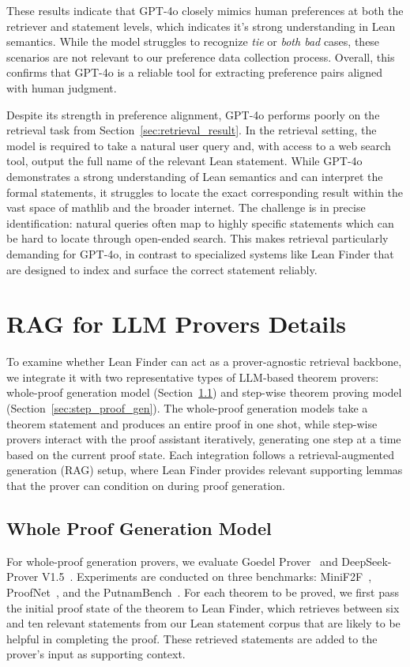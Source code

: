 \documentclass{article} %
\begin{document}
These results indicate that GPT-4o closely mimics human preferences at both the retriever and statement levels, which indicates it's strong understanding in Lean semantics. While the model struggles to recognize \emph{tie} or \emph{both bad} cases, these scenarios are not relevant to our preference data collection process. Overall, this confirms that GPT-4o is a reliable tool for extracting preference pairs aligned with human judgment.  

Despite its strength in preference alignment, GPT-4o performs poorly on the retrieval task from Section~\ref{sec:retrieval_result}. In the retrieval setting, the model is required to take a natural user query and, with access to a web search tool, output the full name of the relevant Lean statement. While GPT-4o demonstrates a strong understanding of Lean semantics and can interpret the formal statements, it struggles to locate the exact corresponding result within the vast space of mathlib and the broader internet. The challenge is in precise identification: natural queries often map to highly specific statements which can be hard to locate through open-ended search. This makes retrieval particularly demanding for GPT-4o, in contrast to specialized systems like Lean Finder that are designed to index and surface the correct statement reliably.

\section{RAG for LLM Provers Details}
\label{prover_integration_appendix}

To examine whether Lean Finder can act as a prover-agnostic retrieval backbone, we integrate it with two representative types of LLM-based theorem provers: whole-proof generation model (Section~\ref{sec:whole_proof_gen}) and step-wise theorem proving model (Section~\ref{sec:step_proof_gen}). The whole-proof generation models take a theorem statement and produces an entire proof in one shot, while step-wise provers interact with the proof assistant iteratively, generating one step at a time based on the current proof state. Each integration follows a retrieval-augmented generation (RAG) setup, where Lean Finder provides relevant supporting lemmas that the prover can condition on during proof generation. 


\subsection{Whole Proof Generation Model}
\label{sec:whole_proof_gen}
For whole-proof generation provers, we evaluate Goedel Prover~\citep{lin2025goedel} and DeepSeek-Prover V1.5~\citep{xin2024deepseekv15}. Experiments are conducted on three benchmarks: MiniF2F~\citep{minif2f}, ProofNet~\citep{proofnet}, and the PutnamBench~\citep{putnam}. For each theorem to be proved, we first pass the initial proof state of the theorem to Lean Finder, which retrieves between six and ten relevant statements from our Lean statement corpus that are likely to be helpful in completing the proof. These retrieved statements are added to the prover’s input as supporting context. 
\end{document}
